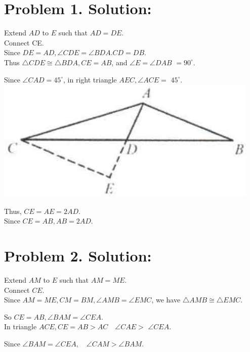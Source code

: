 \documentclass[10pt]{article}
\begin{document}
\section*{Problem 1. Solution:}
Extend \(A D\) to \(E\) such that \(A D=D E\).\\
Connect CE.\\
Since \(D E=A D, \angle C D E=\angle B D A . C D=D B\).\\
Thus \(\triangle C D E \cong \triangle B D A, C E=A B\), and \(\angle E=\angle D A B\) \(=90^{\circ}\).

Since \(\angle C A D=45^{\circ}\), in right triangle \(A E C, \angle A C E=\) \(45^{\circ}\).\\
\includegraphics[max width=\textwidth, center]{2025_04_17_97bc1f7e44d93c271a88g-029}

Thus, \(C E=A E=2 A D\).\\
Since \(C E=A B, A B=2 A D\).

\section*{Problem 2. Solution:}
Extend \(A M\) to \(E\) such that \(A M=M E\).\\
Connect \(C E\).\\
Since \(A M=M E, C M=B M, \angle A M B=\angle E M C\), we have \(\triangle A M B \cong \triangle E M C\).

So \(C E=A B, \angle B A M=\angle C E A\).\\
In triangle \(A C E, C E=A B>A C \quad \angle C A E>\) \(\angle C E A\).

Since \(\angle B A M=\angle C E A, \quad \angle C A M>\angle B A M\).
\end{document}
